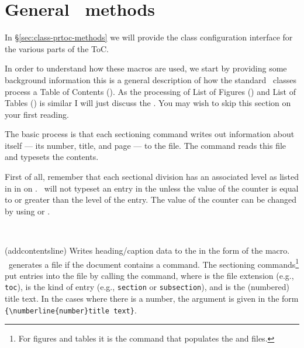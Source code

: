  \section{General \prtoc\ methods}

 In \S\ref{sec:class-prtoc-methods} we will provide the class
 configuration interface for the various parts of the ToC. 

 In order to understand how these macros are used, we start by
 providing some background information this is a general description
 of how the standard \ltx\ classes process a Table of Contents (\toc).
 As the processing of List of Figures (\lof) and List of Tables (\lot)
 is similar I will just discuss the \toc. You may wish to skip this
 section on your first reading.

    The basic process is that each sectioning command writes out information
about itself --- its number, title, and page --- to the  file.
The \cmd{\tableofcontents} command reads this file and typesets the contents.

    First of all, remember that each sectional division has an associated
level as listed in in  on 
. \ltx\ will not typeset an entry in the \toc{}
unless the value of the  counter is equal to or greater
than the level of the entry. The value of the  counter
can be changed by using \cmd{\setcounter} or \cmd{\settocdepth}.

\begin{syntax}
\cmd{\addcontentsline} \\
\end{syntax}
\glossary(addcontentsline)%
  {}%
  {Writes heading/caption data to the  in the form of
   the  macro.}
    \ltx\ generates a  file if the document contains a
 \cmd{\tableofcontents} command. The sectioning 
 commands\footnote{For figures and tables it is the 
 \cmd{\caption} command
 that populates the  and  files.}
 put entries into the  file by calling the 
 \cmd{\addcontentsline} 
 command, where  is the file extension (e.g., \texttt{toc}),
  is the kind of entry (e.g., \texttt{section} or \texttt{subsection}),
 and  is the (numbered) title text. In the cases where
 there is a number, the  argument is given in the
 form \verb?{\numberline{number}title text}?.

